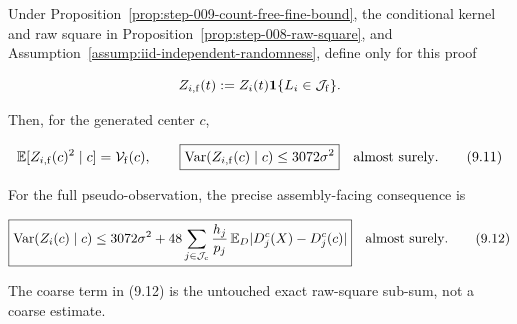 \begin{proposition}\label{prop:step-009-variance-interface}
Under Proposition~\ref{prop:step-009-count-free-fine-bound}, the conditional kernel and raw square in
Proposition~\ref{prop:step-008-raw-square}, and
Assumption~\ref{assump:iid-independent-randomness}, define only for this
proof

\[
Z_{i,{\rm f}}(t)
:=Z_i(t)\mathbf1\{L_i\in\mathcal J_{\rm f}\}.
\]

Then, for the generated center \(c\),

\[
\mathbb E[Z_{i,{\rm f}}(c)^2\mid c]
=\mathcal V_{\rm f}(c),
\qquad
\boxed{
\operatorname{Var}(Z_{i,{\rm f}}(c)\mid c)
\leq3072\sigma^2
}
\quad\text{almost surely}.
\tag{9.11}
\]

For the full pseudo-observation, the precise assembly-facing consequence is

\[
\boxed{
\operatorname{Var}(Z_i(c)\mid c)
\leq3072\sigma^2
+48\sum_{j\in\mathcal J_{\rm c}}
\frac{h_j}{p_j}\,
\mathbb E_D|D_j^c(X)-D_j^c(c)|
}
\quad\text{almost surely}.
\tag{9.12}
\]

The coarse term in (9.12) is the untouched exact raw-square sub-sum, not a
coarse estimate.
\end{proposition}

